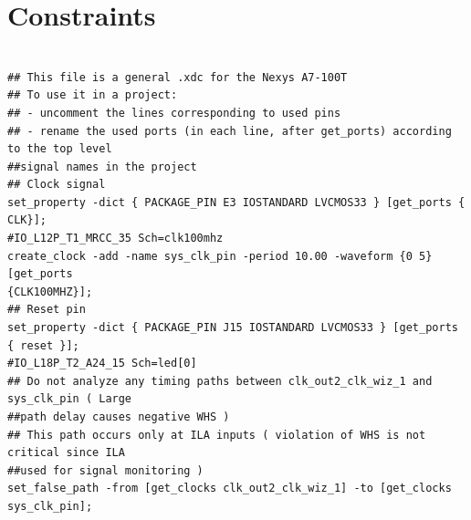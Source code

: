 \documentclass{article}
\begin{document}
\section{Constraints}
\begin{lstlisting}

## This file is a general .xdc for the Nexys A7-100T
## To use it in a project:
## - uncomment the lines corresponding to used pins
## - rename the used ports (in each line, after get_ports) according to the top level
##signal names in the project
## Clock signal
set_property -dict { PACKAGE_PIN E3 IOSTANDARD LVCMOS33 } [get_ports { CLK}];
#IO_L12P_T1_MRCC_35 Sch=clk100mhz
create_clock -add -name sys_clk_pin -period 10.00 -waveform {0 5} [get_ports
{CLK100MHZ}];
## Reset pin
set_property -dict { PACKAGE_PIN J15 IOSTANDARD LVCMOS33 } [get_ports { reset }];
#IO_L18P_T2_A24_15 Sch=led[0]
## Do not analyze any timing paths between clk_out2_clk_wiz_1 and sys_clk_pin ( Large
##path delay causes negative WHS )
## This path occurs only at ILA inputs ( violation of WHS is not critical since ILA
##used for signal monitoring )
set_false_path -from [get_clocks clk_out2_clk_wiz_1] -to [get_clocks sys_clk_pin];


\end{lstlisting}
\end{document}
